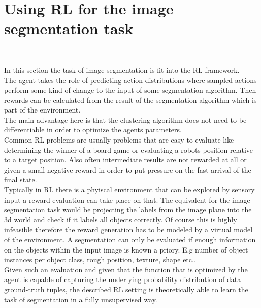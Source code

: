 \section{Using RL for the image segmentation task}~\label{sec:rl_for_seg}

In this section the task of image segmentation is fit into the RL framework.\\
The agent takes the role of predicting action distributions where sampled actions perform some kind of change to the input of some segmentation algorithm. Then rewards can be calculated from the result of the segmentation algorithm which is part of the environment. \\
The main advantage here is that the clustering algorithm does not need to be differentiable in order to optimize the agents parameters.\\
Common RL problems are usually problems that are easy to evaluate like determining the winner of a board game or evaluating a robots position relative to a target position. Also often intermediate results are not rewarded at all or given a small negative reward in order to put pressure on the fast arrival of the final state.\\
Typically in RL there is a phyiscal environment that can be explored by sensory input a reward evaluation can take place on that. The equivalent for the image segmentation task would be projecting the labels from the image plane into the 3d world and check if it labels all objects correctly. Of course this is highly infeasible therefore the reward generation has to be modeled by a virtual model of the environment. A segmentation can only be evaluated if enough information on the objects within the input image is known a priory. E.g number of object instances per object class, rough position, texture, shape etc.. \\
Given such an evaluation and given that the function that is optimized by the agent is capable of capturing the underlying probability distribution of data ground-truth tuples, the described RL setting is theoretically able to learn the task of segmentation in a fully unsupervised way.\\

